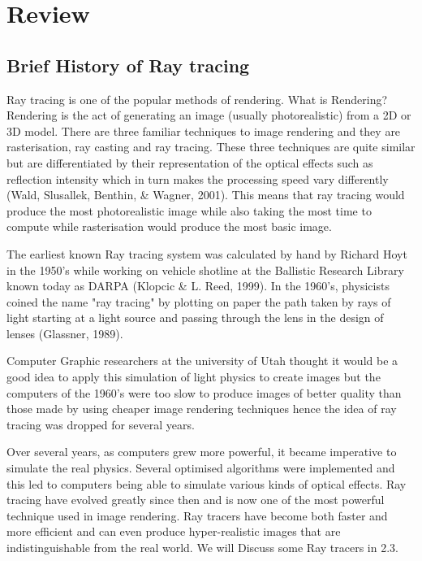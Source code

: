 \documentclass[a4paper]{report}
\begin{document}
	\chapter{Review}
	\section{Brief History of Ray tracing}
	
	\par Ray tracing is one of the popular methods of rendering. What is Rendering? Rendering is the act of generating an image (usually photorealistic) from a 2D or 3D model. There are three familiar techniques to image rendering and they are rasterisation, ray casting and ray tracing. These three techniques are quite similar but are differentiated by their representation of the optical effects such as reflection intensity which in turn makes the processing speed vary differently (Wald, Slusallek, Benthin, \& Wagner, 2001). This means that ray tracing would produce the most photorealistic image while also taking the most time to compute while rasterisation would produce the most basic image.\\
	
	\par The earliest known Ray tracing system was calculated by hand by Richard Hoyt in the 1950's while working on vehicle shotline at the Ballistic Research Library known today as DARPA (Klopcic \& L. Reed, 1999). In the 1960's, physicists coined the name "ray tracing" by plotting on paper the path taken by rays of light starting at a light source and passing through the lens in the design of lenses (Glassner, 1989).\\
	
	\par Computer Graphic researchers at the university of Utah thought it would be a good idea to apply this simulation of light physics to create images but the computers of the 1960's were too slow to produce images of better quality than those made by using cheaper image rendering techniques hence the idea of ray tracing was dropped for several years.\\
	
	\par Over several years, as computers grew more powerful, it became imperative to simulate the real physics. Several optimised algorithms were implemented and this led to computers being able to simulate various kinds of optical effects. Ray tracing have evolved greatly since then and is now one of the most powerful technique used in image rendering. Ray tracers have become both faster and more efficient and can even produce hyper-realistic images that are indistinguishable from the real world. We will Discuss some Ray tracers in 2.3.\\
	
\end{document}
